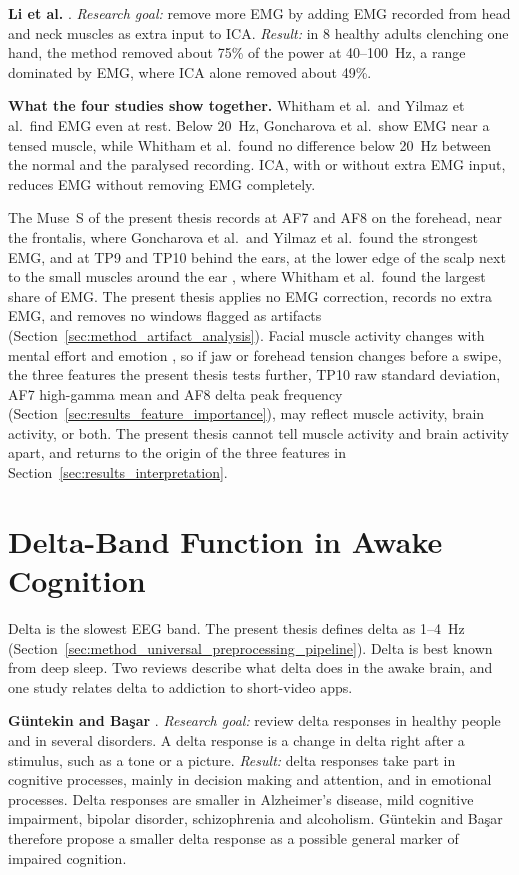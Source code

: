\documentclass[12pt,a4paper]{report}
\begin{document}
\textbf{Li et al.} \cite{li_electromyogram_2021}. \emph{Research goal:} remove more EMG by adding EMG recorded from head and neck muscles as extra input to ICA. \emph{Result:} in 8 healthy adults clenching one hand, the method removed about 75\% of the power at 40--100~Hz, a range dominated by EMG, where ICA alone removed about 49\%.

\textbf{What the four studies show together.} Whitham et al.\ and Yilmaz et al.\ find EMG even at rest. Below 20~Hz, Goncharova et al.\ show EMG near a tensed muscle, while Whitham et al.\ found no difference below 20~Hz between the normal and the paralysed recording. ICA, with or without extra EMG input, reduces EMG without removing EMG completely.

The Muse~S of the present thesis records at AF7 and AF8 on the forehead, near the frontalis, where Goncharova et al.\ and Yilmaz et al.\ found the strongest EMG, and at TP9 and TP10 behind the ears, at the lower edge of the scalp next to the small muscles around the ear \cite{mcmenamin_electromyogenic_2011}, where Whitham et al.\ found the largest share of EMG. The present thesis applies no EMG correction, records no extra EMG, and removes no windows flagged as artifacts (Section~\ref{sec:method_artifact_analysis}). Facial muscle activity changes with mental effort and emotion \cite{mcmenamin_electromyogenic_2011}, so if jaw or forehead tension changes before a swipe, the three features the present thesis tests further, TP10 raw standard deviation, AF7 high-gamma mean and AF8 delta peak frequency (Section~\ref{sec:results_feature_importance}), may reflect muscle activity, brain activity, or both. The present thesis cannot tell muscle activity and brain activity apart, and returns to the origin of the three features in Section~\ref{sec:results_interpretation}.

\section{Delta-Band Function in Awake Cognition}
\label{sec:lit_delta}
Delta is the slowest EEG band. The present thesis defines delta as 1--4~Hz (Section~\ref{sec:method_universal_preprocessing_pipeline}). Delta is best known from deep sleep. Two reviews describe what delta does in the awake brain, and one study relates delta to addiction to short-video apps.

\textbf{Güntekin and Başar} \cite{guntekin_review_2016}. \emph{Research goal:} review delta responses in healthy people and in several disorders. A delta response is a change in delta right after a stimulus, such as a tone or a picture. \emph{Result:} delta responses take part in cognitive processes, mainly in decision making and attention, and in emotional processes. Delta responses are smaller in Alzheimer's disease, mild cognitive impairment, bipolar disorder, schizophrenia and alcoholism. Güntekin and Başar therefore propose a smaller delta response as a possible general marker of impaired cognition.
\end{document}
